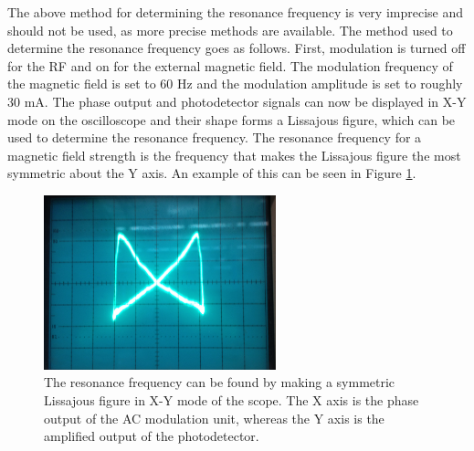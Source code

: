 \documentclass[11pt,letterpaper]{article}
\begin{document}
The above method for determining the resonance frequency is very imprecise and
should not be used, as more precise methods are available. The method used to
determine the resonance frequency goes as follows. First, modulation is turned
off for the RF and on for the external magnetic field. The modulation frequency
of the magnetic field is set to 60 Hz and the modulation amplitude is set to
roughly 30 mA. The phase output and photodetector signals can now be displayed
in X-Y mode on the oscilloscope and their shape forms a Lissajous figure, which
can be used to determine the resonance frequency. The resonance frequency for a
magnetic field strength is the frequency that makes the Lissajous figure the
most symmetric about the Y axis. An example of this can be seen in Figure
\ref{lissajous}.\\

\begin{figure}
    \centering
    \includegraphics[width=0.6\textwidth]{figures/IMG_1242.JPG}
    \caption{The resonance frequency can be found by making a symmetric
    Lissajous figure in X-Y mode of the scope. The X axis is the phase output of
    the AC modulation unit, whereas the Y axis is the amplified output of the
    photodetector.}
    \label{lissajous}
\end{figure}
\end{document}
